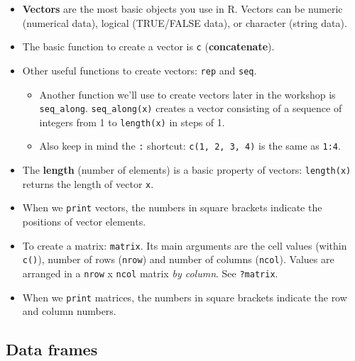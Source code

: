 \documentclass[
]{book}
\providecommand{\tightlist}{%
  \setlength{\itemsep}{0pt}\setlength{\parskip}{0pt}}
\begin{document}
\begin{itemize}
\tightlist
\item
  \textbf{Vectors} are the most basic objects you use in R. Vectors can be numeric (numerical data), logical (TRUE/FALSE data), or character (string data).
\item
  The basic function to create a vector is \texttt{c} (\textbf{concatenate}).
\item
  Other useful functions to create vectors: \texttt{rep} and \texttt{seq}.

  \begin{itemize}
  \tightlist
  \item
    Another function we'll use to create vectors later in the workshop is \texttt{seq\_along}. \texttt{seq\_along(x)} creates a vector consisting of a sequence of integers from 1 to \texttt{length(x)} in steps of 1.
  \item
    Also keep in mind the \texttt{:} shortcut: \texttt{c(1,\ 2,\ 3,\ 4)} is the same as \texttt{1:4}.
  \end{itemize}
\item
  The \textbf{length} (number of elements) is a basic property of vectors: \texttt{length(x)} returns the length of vector \texttt{x}.
\item
  When we \texttt{print} vectors, the numbers in square brackets indicate the positions of vector elements.
\item
  To create a matrix: \texttt{matrix}. Its main arguments are the cell values (within \texttt{c()}), number of rows (\texttt{nrow}) and number of columns (\texttt{ncol}). Values are arranged in a \texttt{nrow} x \texttt{ncol} matrix \emph{by column}. See \texttt{?matrix}.
\item
  When we \texttt{print} matrices, the numbers in square brackets indicate the row and column numbers.
\end{itemize}

\hypertarget{dataframes}{%
\subsection{Data frames}\label{dataframes}}
\end{document}
